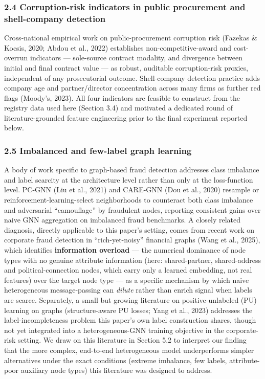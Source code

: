 \documentclass[11pt,]{article}
\begin{document}
\hypertarget{corruption-risk-indicators-in-public-procurement-and-shell-company-detection}{%
\subsubsection{2.4 Corruption-risk indicators in public procurement and
shell-company
detection}\label{corruption-risk-indicators-in-public-procurement-and-shell-company-detection}}

Cross-national empirical work on public-procurement corruption risk
(Fazekas \& Kocsis, 2020; Abdou et al., 2022) establishes
non-competitive-award and cost-overrun indicators --- sole-source
contract modality, and divergence between initial and final contract
value --- as robust, auditable corruption-risk proxies, independent of
any prosecutorial outcome. Shell-company detection practice adds company
age and partner/director concentration across many firms as further red
flags (Moody's, 2023). All four indicators are feasible to construct
from the registry data used here (Section 3.4) and motivated a dedicated
round of literature-grounded feature engineering prior to the final
experiment reported below.

\hypertarget{imbalanced-and-few-label-graph-learning}{%
\subsubsection{2.5 Imbalanced and few-label graph
learning}\label{imbalanced-and-few-label-graph-learning}}

A body of work specific to graph-based fraud detection addresses class
imbalance and label scarcity at the architecture level rather than only
at the loss-function level. PC-GNN (Liu et al., 2021) and CARE-GNN (Dou
et al., 2020) resample or reinforcement-learning-select neighborhoods to
counteract both class imbalance and adversarial ``camouflage'' by
fraudulent nodes, reporting consistent gains over naive GNN aggregation
on imbalanced fraud benchmarks. A closely related diagnosis, directly
applicable to this paper's setting, comes from recent work on corporate
fraud detection in ``rich-yet-noisy'' financial graphs (Wang et al.,
2025), which identifies \textbf{information overload} --- the numerical
dominance of node types with no genuine attribute information (here:
shared-partner, shared-address and political-connection nodes, which
carry only a learned embedding, not real features) over the target node
type --- as a specific mechanism by which naive heterogeneous
message-passing can \emph{dilute} rather than enrich signal when labels
are scarce. Separately, a small but growing literature on
positive-unlabeled (PU) learning on graphs (structure-aware PU losses;
Yang et al., 2023) addresses the label-incompleteness problem this
paper's own label construction shares, though not yet integrated into a
heterogeneous-GNN training objective in the corporate-risk setting. We
draw on this literature in Section 5.2 to interpret our finding that the
more complex, end-to-end heterogeneous model underperforms simpler
alternatives under the exact conditions (extreme imbalance, few labels,
attribute-poor auxiliary node types) this literature was designed to
address.
\end{document}
